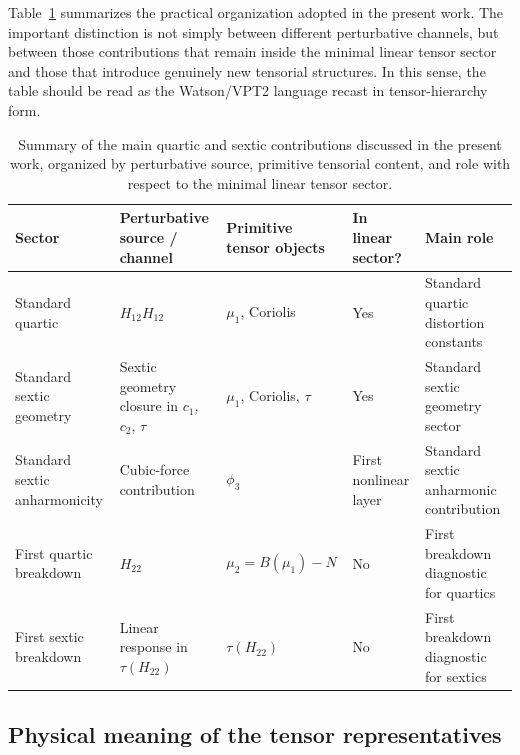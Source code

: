 Table~\ref{tab:channel_hierarchy_summary} summarizes the practical
organization adopted in the present work. The important distinction is
not simply between different perturbative channels, but between those
contributions that remain inside the minimal linear tensor sector and
those that introduce genuinely new tensorial structures. In this
sense, the table should be read as the Watson/VPT2 language recast in
tensor-hierarchy form.\cite{Watson1968,Watson1977,Mills1972}

\begin{table}[t]
\centering
\caption{Summary of the main quartic and sextic contributions discussed in the
present work, organized by perturbative source, primitive tensorial content,
and role with respect to the minimal linear tensor sector.}
\begin{tabular}{lllll}
\toprule
Sector & Perturbative source / channel & Primitive tensor objects & In linear sector? & Main role \\
\midrule
Standard quartic & $H_{12}H_{12}$ & $\mu_1$, Coriolis & Yes & Standard quartic distortion constants \\
Standard sextic geometry & Sextic geometry closure in $c_1$, $c_2$, $\tau$ & $\mu_1$, Coriolis, $\tau$ & Yes & Standard sextic geometry sector \\
Standard sextic anharmonicity & Cubic-force contribution & $\phi_3$ & First nonlinear layer & Standard sextic anharmonic contribution \\
First quartic breakdown & $H_{22}$ & $\mu_2 = B(\mu_1)-N$ & No & First breakdown diagnostic for quartics \\
First sextic breakdown & Linear response in $\tau(H_{22})$ & $\tau(H_{22})$ & No & First breakdown diagnostic for sextics \\
\bottomrule
\end{tabular}
\label{tab:channel_hierarchy_summary}
\end{table}

\subsection{Physical meaning of the tensor representatives}

